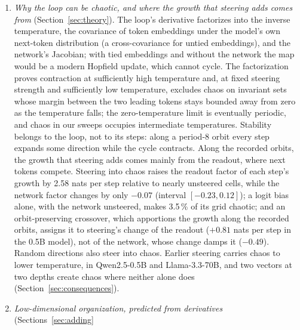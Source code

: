\documentclass[11pt,letterpaper]{article}
\begin{document}
\begin{enumerate}
  neighboring loops in no fixed order, and a copy started $10^{-10}$ away writes the same text for 9 to 150 steps,
  then a different one (Table~\ref{tab:chaostexts}). Exactly repeating text can hide a state with a positive finite-time exponent: the text records only the most
  probable token, and the same token can win at every step while the probabilities behind it, which the loop feeds
  back, do not repeat over the run (Section~\ref{sec:hostile}). Beyond the model's
  first-token uncertainty, the loop's regime carries no detectable information about the accuracy of ordinary sampled
  answers, and within the precision of the tested designs we detect no advantage at the edge of chaos.
\item \emph{Why the loop can be chaotic, and where the growth that steering adds comes from}
  (Section~\ref{sec:theory}). The loop's derivative
  factorizes into the inverse temperature, the covariance of token embeddings under the model's own next-token
  distribution (a cross-covariance for untied embeddings), and the network's Jacobian; with tied embeddings and without the network the map would be a modern Hopfield update, which
  cannot cycle. The factorization proves contraction at sufficiently high temperature and, at fixed steering strength
  and sufficiently low temperature, excludes chaos on invariant sets whose margin between the two leading tokens stays
  bounded away from zero as the temperature falls; the zero-temperature limit is eventually periodic, and chaos in our
  sweeps occupies intermediate temperatures. Stability belongs to the loop, not
  to its steps: along a period-8 orbit every step expands some direction while the cycle contracts. Along the recorded
  orbits, the growth that steering adds comes mainly from the readout, where next tokens compete. Steering into chaos
  raises the readout factor of each step's growth by
  2.58 nats per step relative to nearly unsteered cells, while the network factor changes by only $-0.07$ (interval
  $[-0.23,0.12]$); a logit bias alone, with the network unsteered, makes 3.5\,\% of its grid chaotic; and an
  orbit-preserving crossover, which apportions the growth along the recorded orbits, assigns it to steering's change of
  the readout ($+0.81$ nats per step in the 0.5B model), not of the network, whose change damps it ($-0.49$). Random directions also steer
  into chaos. Earlier steering carries chaos to lower temperature, in Qwen2.5-0.5B and Llama-3.3-70B, and two vectors
  at two depths create chaos where neither alone does (Section~\ref{sec:consequences}).
\item \emph{Low-dimensional organization, predicted from derivatives} (Sections~\ref{sec:adding}

\end{enumerate}
\end{document}
